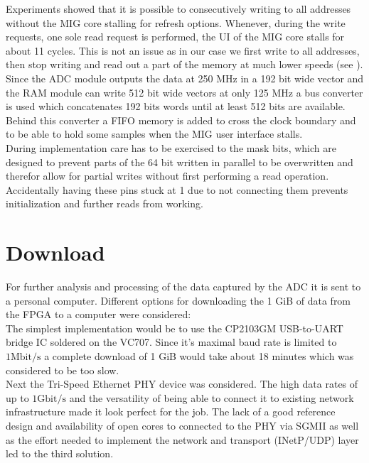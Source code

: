 Experiments showed that it is possible to consecutively writing to all
addresses without the \gls{MIG} core stalling for refresh options.
Whenever, during the write requests, one sole read request
is performed, the \gls{UI} of the \gls{MIG} core stalls for about 11
cycles. This is not an issue as in our case we first write
to all addresses, then stop writing and read out a part of the memory
at much lower speeds (see ). \\

Since the \gls{ADC} module outputs the data at 250 MHz in a 192 bit
wide vector and the \gls{RAM} module can write 512 bit wide vectors
at only 125 MHz a bus converter is used which concatenates 192 bits
words until at least 512 bits are available. Behind this converter
a \gls{FIFO} memory is added to cross the clock boundary and to be able
to hold some samples when the \gls{MIG} user interface stalls. \\

During implementation care has to be exercised to the mask bits,
which are designed to prevent parts of the 64 bit written in parallel to be
overwritten and therefor allow for partial writes without first performing
a read operation. Accidentally having these pins stuck at 1 due to
not connecting them prevents initialization and further reads from
working. \\

\section{Download}
\label{sec:fpga_download}
For further analysis and processing of the data captured by the \gls{ADC}
it is sent to a personal computer.
Different options for downloading the 1 GiB of data from the \gls{FPGA}
to a computer were considered: \\

The simplest implementation would be to use the CP2103GM
\acrshort{USB}-to-\acrshort{UART} bridge \gls{IC} soldered on the VC707.
Since it's maximal baud rate is limited to $1 \text{Mbit}/\text{s}$
a complete download of 1 GiB would take about 18 minutes which was
considered to be too slow. \\

Next the Tri-Speed Ethernet \acrshort{PHY} device was considered.
The high data rates of up to $1 \text{Gbit}/\text{s}$ and the versatility
of being able to connect it to existing network infrastructure made
it look perfect for the job. The lack of a good reference design and
availability of open cores to connected to the \gls{PHY} via
\acrshort{SGMII} as well as the effort needed to implement
the network and transport (\acrshort{INetP}/\acrshort{UDP}) layer
led to the third solution. \\

